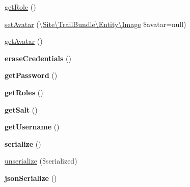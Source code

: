 \begin{DoxyCompactItemize}
\item 
\hyperlink{class_site_1_1_trail_bundle_1_1_entity_1_1_membre_a0b2e7098f1c48a7439a42bada5b69689}{get\+Role} ()
\item 
\hyperlink{class_site_1_1_trail_bundle_1_1_entity_1_1_membre_af1d924dc844279103178db79ca9b8cd2}{set\+Avatar} (\textbackslash{}\hyperlink{class_site_1_1_trail_bundle_1_1_entity_1_1_image}{Site\textbackslash{}\+Trail\+Bundle\textbackslash{}\+Entity\textbackslash{}\+Image} \$avatar=null)
\item 
\hyperlink{class_site_1_1_trail_bundle_1_1_entity_1_1_membre_a1187cffccd2c30f1d108bd8388e19925}{get\+Avatar} ()
\item 
\hypertarget{class_site_1_1_trail_bundle_1_1_entity_1_1_membre_ac565b8c00fe93ce673f8237849f072a6}{}{\bfseries erase\+Credentials} ()\label{class_site_1_1_trail_bundle_1_1_entity_1_1_membre_ac565b8c00fe93ce673f8237849f072a6}

\item 
\hypertarget{class_site_1_1_trail_bundle_1_1_entity_1_1_membre_a04e0957baeb7acde9c0c86556da2d43f}{}{\bfseries get\+Password} ()\label{class_site_1_1_trail_bundle_1_1_entity_1_1_membre_a04e0957baeb7acde9c0c86556da2d43f}

\item 
\hypertarget{class_site_1_1_trail_bundle_1_1_entity_1_1_membre_aa676cae5ee8d7fb6862a8724adc2660d}{}{\bfseries get\+Roles} ()\label{class_site_1_1_trail_bundle_1_1_entity_1_1_membre_aa676cae5ee8d7fb6862a8724adc2660d}

\item 
\hypertarget{class_site_1_1_trail_bundle_1_1_entity_1_1_membre_a1dfe56d2c965d451a135f3f3910a8b8d}{}{\bfseries get\+Salt} ()\label{class_site_1_1_trail_bundle_1_1_entity_1_1_membre_a1dfe56d2c965d451a135f3f3910a8b8d}

\item 
\hypertarget{class_site_1_1_trail_bundle_1_1_entity_1_1_membre_a81b37a3c9d639574e394f80c1138c75e}{}{\bfseries get\+Username} ()\label{class_site_1_1_trail_bundle_1_1_entity_1_1_membre_a81b37a3c9d639574e394f80c1138c75e}

\item 
\hypertarget{class_site_1_1_trail_bundle_1_1_entity_1_1_membre_a4d9813fea8525b19a1d370eeb8fe41d6}{}{\bfseries serialize} ()\label{class_site_1_1_trail_bundle_1_1_entity_1_1_membre_a4d9813fea8525b19a1d370eeb8fe41d6}

\item 
\hyperlink{class_site_1_1_trail_bundle_1_1_entity_1_1_membre_ac2f3a0997c46fd9bb24fe4190f738eb0}{unserialize} (\$serialized)
\item 
\hypertarget{class_site_1_1_trail_bundle_1_1_entity_1_1_membre_ad402d8679325bc514874370f02b5c2ac}{}{\bfseries json\+Serialize} ()\label{class_site_1_1_trail_bundle_1_1_entity_1_1_membre_ad402d8679325bc514874370f02b5c2ac}

\end{DoxyCompactItemize}



